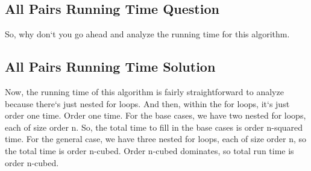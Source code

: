 \subsection{All Pairs  Running Time Question}
So, why don`t you go ahead and analyze the running time for this algorithm.

\subsection{All Pairs  Running Time Solution}
Now, the running time of this algorithm is fairly straightforward to analyze because there`s just nested for loops.
And then, within the for loops, it`s just order one time.
Order one time.
For the base cases, we have two nested for loops, each of size order n.
So, the total time to fill in the base cases is order n-squared time.
For the general case, we have three nested for loops, each of size order n, so the total time is order n-cubed.
Order n-cubed dominates, so total run time is order n-cubed.


